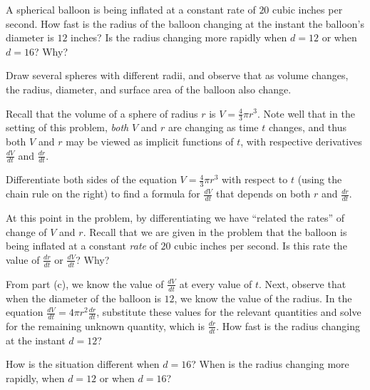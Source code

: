 \begin{pa} \label{PA:3.5}
A spherical balloon is being inflated at a constant rate of $20$ cubic inches per second.  How fast is the radius of the balloon changing at the instant the balloon's diameter is $12$ inches?  Is the radius changing more rapidly when $d = 12$ or when $d = 16$?  Why?
\ba
	\item Draw several spheres with different radii, and observe that as volume changes, the radius, diameter, and surface area of the balloon also change.  
	\item Recall that the volume of a sphere of radius $r$ is $V = \frac{4}{3} \pi r^3$.  Note well that in the setting of this problem, \emph{both} $V$ and $r$ are changing as time $t$ changes, and thus both $V$ and $r$ may be viewed as implicit functions of $t$, with respective derivatives $\frac{dV}{dt}$ and $\frac{dr}{dt}$.  
	
	Differentiate both sides of the equation $V = \frac{4}{3} \pi r^3$ with respect to $t$ (using the chain rule on the right) to find a formula for $\frac{dV}{dt}$ that depends on both $r$ and $\frac{dr}{dt}$.
	\item At this point in the problem, by differentiating we have ``related the rates'' of change of $V$ and $r$.  Recall that we are given in the problem that the balloon is being inflated at a constant \emph{rate} of $20$ cubic inches per second.  Is this rate the value of $\frac{dr}{dt}$ or $\frac{dV}{dt}$?  Why?
	\item From part (c), we know the value of $\frac{dV}{dt}$ at every value of $t$.  Next, observe that when the diameter of the balloon is $12$, we know the value of the radius.  In the equation $\frac{dV}{dt} = 4\pi r^2 \frac{dr}{dt}$, substitute these values for the relevant quantities and solve for the remaining unknown quantity, which is $\frac{dr}{dt}$.  How fast is the radius changing at the instant $d = 12$?
	\item How is the situation different when $d = 16$?  When is the radius changing more rapidly, when $d = 12$ or when $d = 16$?
\ea
\end{pa} 
\afterpa